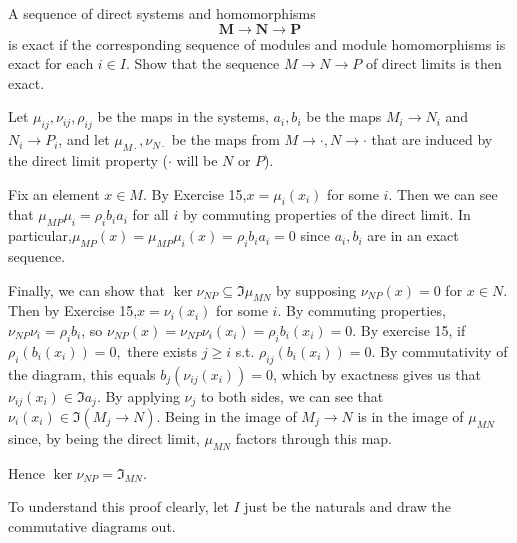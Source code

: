 \begin{questions}
	\question A sequence of direct systems and homomorphisms
	\[
		\bm{M} \to \bm{N} \to \bm{P}
	\]
	is exact if the corresponding sequence of modules and module homomorphisms is exact for each $i\in I$. Show that the sequence $M\to N\to P$ of direct limits is then exact.
	\begin{solution}
		Let $\mu_{ij},\nu_{ij},\rho_{ij}$ be the maps in the systems, $a_i,b_i$ be the maps $M_i\to N_i$ and $N_i\to P_i $, and let $\mu_{M\cdot}, \nu_{N\cdot}$ be the maps from $M\to \cdot, N\to\cdot$ that are induced by the direct limit property ($\cdot$ will be $N$ or $P $).

		Fix an element $x \in M$.
		By Exercise 15,$x = \mu_i(x_i)$ for some $i$.
		Then we can see that $\mu_{MP} \mu_i = \rho _i b_ia_i$ for all $i$ by commuting properties of the direct limit.
		In particular,$\mu _{MP}(x) = \mu _{MP}\mu_i(x) = \rho_i b_ia_i = 0$ since $a_i,b_i$ are in an exact sequence.

		Finally, we can show that $\ker \nu_{NP} \subseteq \Im \mu_{MN}$ by supposing $\nu_{NP}(x) = 0$ for $x\in N$.
		Then by Exercise 15,$x = \nu_i(x_i)$ for some $i$.
		By commuting properties,$\nu_{NP}\nu_i = \rho_ib_i $, so $\nu_{NP}(x) = \nu_{NP}\nu_i(x_i) = \rho_ib_i(x_i) = 0$.
		By exercise 15, if $\rho_i(b_i(x_i)) = 0,$ there exists $j\ge i$ s.t. $\rho_{ij}(b_i(x_i)) = 0$.
		By commutativity of the diagram, this equals $b_j(\nu_{ij}(x_i)) = 0 $, which by exactness gives us that $\nu_{ij}(x_i) \in \Im a_j$.
		By applying $\nu_j$ to both sides, we can see that $\nu_i(x_i) \in \Im(M_j\to N)$.
		Being in the image of $M_j\to N$ is in the image of $\mu_{MN}$ since, by being the direct limit, $\mu_{MN}$ factors through this map.

		Hence $\ker \nu_{NP} = \Im_{MN}$.

		To understand this proof clearly, let $I$ just be the naturals and draw the commutative diagrams out.
	\end{solution}


\end{questions}
